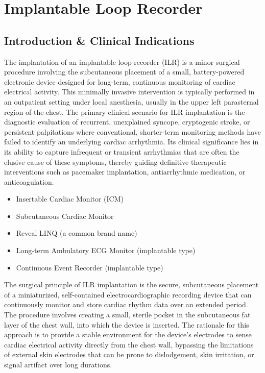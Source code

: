 \chapter{Implantable Loop Recorder}

\section*{Introduction \& Clinical Indications}
The implantation of an implantable loop recorder (ILR) is a minor surgical procedure involving the subcutaneous placement of a small, battery-powered electronic device designed for long-term, continuous monitoring of cardiac electrical activity. This minimally invasive intervention is typically performed in an outpatient setting under local anesthesia, usually in the upper left parasternal region of the chest. The primary clinical scenario for ILR implantation is the diagnostic evaluation of recurrent, unexplained syncope, cryptogenic stroke, or persistent palpitations where conventional, shorter-term monitoring methods have failed to identify an underlying cardiac arrhythmia. Its clinical significance lies in its ability to capture infrequent or transient arrhythmias that are often the elusive cause of these symptoms, thereby guiding definitive therapeutic interventions such as pacemaker implantation, antiarrhythmic medication, or anticoagulation.

\begin{itemize}
  \item Insertable Cardiac Monitor (ICM)
  \item Subcutaneous Cardiac Monitor
  \item Reveal LINQ\textregistered{} (a common brand name)
  \item Long-term Ambulatory ECG Monitor (implantable type)
  \item Continuous Event Recorder (implantable type)
\end{itemize}

The surgical principle of ILR implantation is the secure, subcutaneous placement of a miniaturized, self-contained electrocardiographic recording device that can continuously monitor and store cardiac rhythm data over an extended period. The procedure involves creating a small, sterile pocket in the subcutaneous fat layer of the chest wall, into which the device is inserted. The rationale for this approach is to provide a stable environment for the device's electrodes to sense cardiac electrical activity directly from the chest wall, bypassing the limitations of external skin electrodes that can be prone to dislodgement, skin irritation, or signal artifact over long durations.

